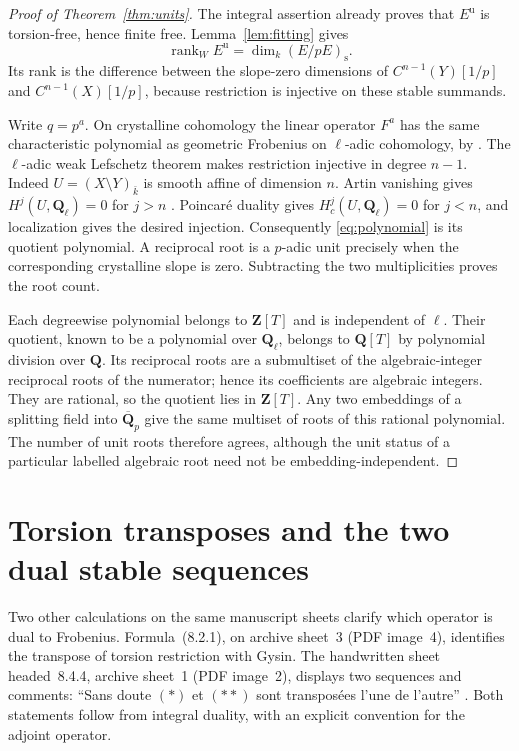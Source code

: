 \documentclass[11pt]{article}
\theoremstyle{remark}\newtheorem{remark}[theorem]{Remark}
\newcommand{\st}{\mathrm{s}}
\newcommand{\uF}{\mathrm{u}}
\begin{document}
\begin{proof}[Proof of Theorem~\ref{thm:units}]
The integral assertion already proves that $E^{\uF}$ is torsion-free, hence finite free. Lemma~\ref{lem:fitting} gives
\[
 \operatorname{rank}_W E^{\uF}=\dim_k(E/pE)_{\st}.
\]
Its rank is the difference between the slope-zero dimensions of $C^{n-1}(Y)[1/p]$ and $C^{n-1}(X)[1/p]$, because restriction is injective on these stable summands.

Write $q=p^a$. On crystalline cohomology the linear operator $F^a$ has the same characteristic polynomial as geometric Frobenius on $\ell$-adic cohomology, by \citet[Theorem~1, p.~74]{KatzMessing}. The $\ell$-adic weak Lefschetz theorem makes restriction injective in degree $n-1$. Indeed $U=(X\setminus Y)_{\bar k}$ is smooth affine of dimension $n$. Artin vanishing gives $H^j(U,\mathbf Q_\ell)=0$ for $j>n$ \citep[Expos\'e~XIV, Corollary~3.2, p.~160]{SGA4}. Poincar\'e duality gives $H_c^j(U,\mathbf Q_\ell)=0$ for $j<n$, and localization gives the desired injection. Consequently \eqref{eq:polynomial} is its quotient polynomial. A reciprocal root is a $p$-adic unit precisely when the corresponding crystalline slope is zero. Subtracting the two multiplicities proves the root count.

Each degreewise polynomial belongs to $\mathbf Z[T]$ and is independent of $\ell$. Their quotient, known to be a polynomial over $\mathbf Q_\ell$, belongs to $\mathbf Q[T]$ by polynomial division over $\mathbf Q$. Its reciprocal roots are a submultiset of the algebraic-integer reciprocal roots of the numerator; hence its coefficients are algebraic integers. They are rational, so the quotient lies in $\mathbf Z[T]$. Any two embeddings of a splitting field into $\overline{\mathbf Q}_p$ give the same multiset of roots of this rational polynomial. The number of unit roots therefore agrees, although the unit status of a particular labelled algebraic root need not be embedding-independent.
\end{proof}

\section{Torsion transposes and the two dual stable sequences}

Two other calculations on the same manuscript sheets clarify which operator is dual to Frobenius. Formula~(8.2.1), on archive sheet~3 (PDF image~4), identifies the transpose of torsion restriction with Gysin. The handwritten sheet headed~8.4.4, archive sheet~1 (PDF image~2), displays two sequences and comments: ``Sans doute $(*)$ et $(**)$ sont transpos\'ees l'une de l'autre'' \citep{GrothendieckNotes}. Both statements follow from integral duality, with an explicit convention for the adjoint operator.
\end{document}
